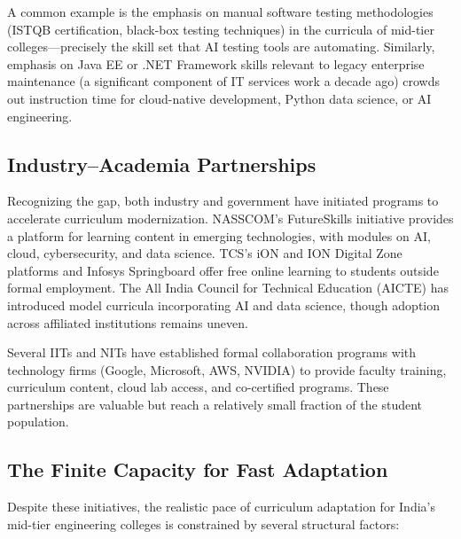 \documentclass[conference]{IEEEtran}
\begin{document}
A common example is the emphasis on manual software testing methodologies (ISTQB certification, black-box testing techniques) in the curricula of mid-tier colleges---precisely the skill set that AI testing tools are automating. Similarly, emphasis on Java EE or .NET Framework skills relevant to legacy enterprise maintenance (a significant component of IT services work a decade ago) crowds out instruction time for cloud-native development, Python data science, or AI engineering.

\subsection{Industry--Academia Partnerships}

Recognizing the gap, both industry and government have initiated programs to accelerate curriculum modernization. NASSCOM's FutureSkills initiative provides a platform for learning content in emerging technologies, with modules on AI, cloud, cybersecurity, and data science. TCS's iON and ION Digital Zone platforms and Infosys Springboard offer free online learning to students outside formal employment. The All India Council for Technical Education (AICTE) has introduced model curricula incorporating AI and data science, though adoption across affiliated institutions remains uneven.

Several IITs and NITs have established formal collaboration programs with technology firms (Google, Microsoft, AWS, NVIDIA) to provide faculty training, curriculum content, cloud lab access, and co-certified programs. These partnerships are valuable but reach a relatively small fraction of the student population.

\subsection{The Finite Capacity for Fast Adaptation}

Despite these initiatives, the realistic pace of curriculum adaptation for India's mid-tier engineering colleges is constrained by several structural factors:
\end{document}
